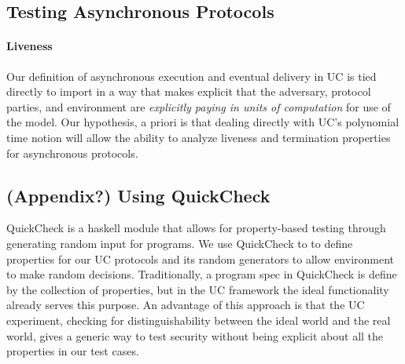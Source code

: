 \subsection{Testing Asynchronous Protocols}


\paragraph{Liveness}
Our definition of asynchronous execution and eventual delivery in UC is tied directly to import in a way that makes explicit that the adversary, protocol parties, and environment are \emph{explicitly paying in units of computation} for use of the model. 
Our hypothesis, a priori is that dealing directly with UC's polynomial time notion will allow the ability to analyze liveness and termination properties for asynchronous protocols. 





\subsection{(Appendix?) Using QuickCheck}
QuickCheck is a haskell module that allows for property-based testing through generating random input for programs.
We use QuickCheck to to define properties for our UC protocols and its random generators to allow environment to make random decisions.
Traditionally, a program spec in QuickCheck is define by the collection of properties, but in the UC framework the ideal functionality already serves this purpose.
An advantage of this approach is that the UC experiment, checking for distinguishability between the ideal world and the real world, gives a generic way to test security without being explicit about all the properties in our test cases.

